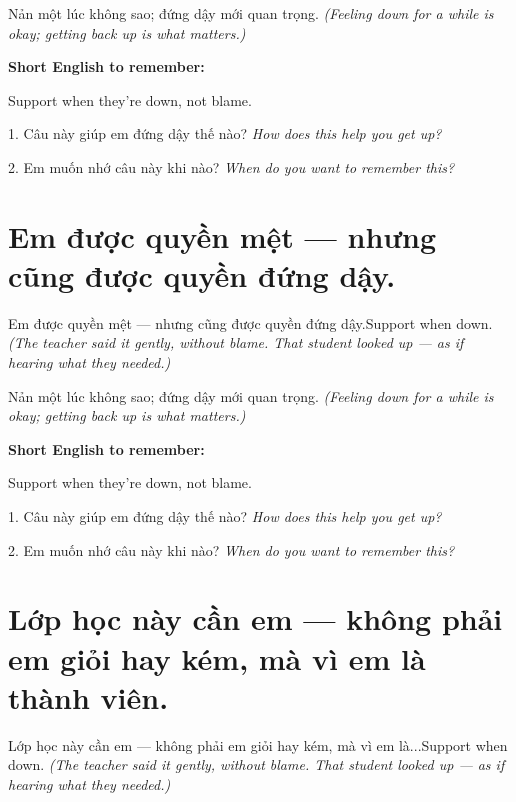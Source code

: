 \begin{baihoc}
Nản một lúc không sao; đứng dậy mới quan trọng.
\textit{(Feeling down for a while is okay; getting back up is what matters.)}
\end{baihoc}

\begin{ghinhoanh}
\textbf{Short English to remember:}

Support when they're down, not blame.

\end{ghinhoanh}

\begin{tuhocnhanh}
1. Câu này giúp em đứng dậy thế nào? \textit{How does this help you get up?}

2. Em muốn nhớ câu này khi nào? \textit{When do you want to remember this?}
\end{tuhocnhanh}
\ngancach


\section{Em được quyền mệt — nhưng cũng được quyền đứng dậy.}
\begin{truyen}{Em được quyền mệt — nhưng cũng được quyền đứng dậy.}{Support when down.}
\textit{(The teacher said it gently, without blame. That student looked up — as if hearing what they needed.)}
\end{truyen}

\begin{baihoc}
Nản một lúc không sao; đứng dậy mới quan trọng.
\textit{(Feeling down for a while is okay; getting back up is what matters.)}
\end{baihoc}

\begin{ghinhoanh}
\textbf{Short English to remember:}

Support when they're down, not blame.

\end{ghinhoanh}

\begin{tuhocnhanh}
1. Câu này giúp em đứng dậy thế nào? \textit{How does this help you get up?}

2. Em muốn nhớ câu này khi nào? \textit{When do you want to remember this?}
\end{tuhocnhanh}
\ngancach


\section{Lớp học này cần em — không phải em giỏi hay kém, mà vì em là thành viên.}
\begin{truyen}{Lớp học này cần em — không phải em giỏi hay kém, mà vì em là...}{Support when down.}
\textit{(The teacher said it gently, without blame. That student looked up — as if hearing what they needed.)}
\end{truyen}

